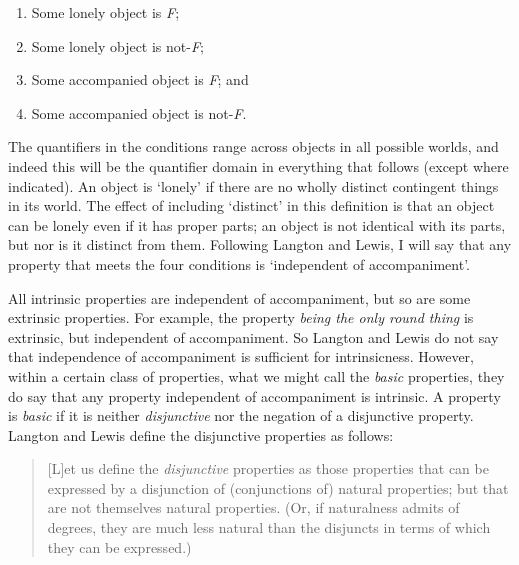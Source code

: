 \begin{enumerate}
\renewcommand{\labelenumi}{(\alph{enumi})}
\item Some lonely object is \textit{F};
\item Some lonely object is not\nobreakdash-\textit{F};
\item Some accompanied object is \textit{F}; and
\item Some accompanied object is not\nobreakdash-\textit{F}.
\end{enumerate}
\renewcommand{\labelenumi}{\arabic{enumi}.}

\noindent The quantifiers in the conditions range across objects in all possible worlds, and indeed this will be the quantifier domain in everything that follows (except where indicated). An object is `lonely' if there are no wholly distinct contingent things in its world. The effect of including `distinct' in this definition is that an object can be lonely even if it has proper parts; an object is not identical with its parts, but nor is it distinct from them. Following Langton and Lewis, I will say that any property that meets the four conditions is `independent of accompaniment'. 

All intrinsic properties are independent of accompaniment, but so are some extrinsic properties. For example, the property \textit{being the only round thing }is extrinsic, but independent of accompaniment. So Langton and Lewis do not say that independence of accompaniment is sufficient for intrinsicness. However, within a certain class of properties, what we might call the \textit{basic} properties, they do say that any property independent of accompaniment is intrinsic. A property is \textit{basic} if it is neither \textit{disjunctive} nor the negation of a disjunctive property. Langton and Lewis define the disjunctive properties as follows:

\begin{quote}
[L]et us define the \textit{disjunctive }properties as those properties that can be expressed by a disjunction of (conjunctions of) natural properties; but that are not themselves natural properties. (Or, if naturalness admits of degrees, they are much less natural than the disjuncts in terms of which they can be expressed.) \citet{Lewis2001Langton}
\end{quote}

